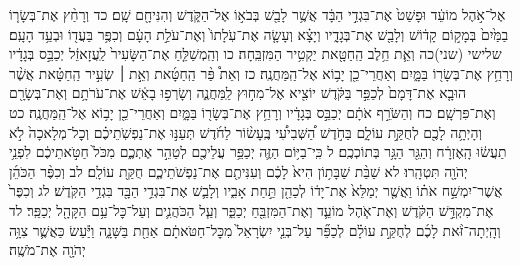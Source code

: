 \documentclass[twoside, openany, parskip=half, 11pt]{book}
\begin{document}
אֶל־אֹ֣הֶל מוֹעֵ֔ד וּפָשַׁט֙ אֶת־בִּגְדֵ֣י הַבָּ֔ד אֲשֶׁ֥ר לָבַ֖שׁ בְּבֹא֣וֹ אֶל־הַקֹּ֑דֶשׁ וְהִנִּיחָ֖ם שָֽׁם׃ כד וְרָחַ֨ץ אֶת־בְּשָׂר֤וֹ בַמַּ֙יִם֙ בְּמָק֣וֹם קָד֔וֹשׁ וְלָבַ֖שׁ אֶת־בְּגָדָ֑יו וְיָצָ֗א וְעָשָׂ֤ה אֶת־עֹֽלָתוֹ֙ וְאֶת־עֹלַ֣ת הָעָ֔ם וְכִפֶּ֥ר בַּעֲד֖וֹ וּבְעַ֥ד הָעָֽם׃ שלישי (שני)כה וְאֵ֛ת חֵ֥לֶב הַֽחַטָּ֖את יַקְטִ֥יר הַמִּזְבֵּֽחָה׃ כו וְהַֽמְשַׁלֵּ֤חַ אֶת־הַשָּׂעִיר֙ לַֽעֲזָאזֵ֔ל יְכַבֵּ֣ס בְּגָדָ֔יו וְרָחַ֥ץ אֶת־בְּשָׂר֖וֹ בַּמָּ֑יִם וְאַחֲרֵי־כֵ֖ן יָב֥וֹא אֶל־הַֽמַּחֲנֶֽה׃ כז וְאֵת֩ פַּ֨ר הַֽחַטָּ֜את וְאֵ֣ת ׀ שְׂעִ֣יר הַֽחַטָּ֗את אֲשֶׁ֨ר הוּבָ֤א אֶת־דָּמָם֙ לְכַפֵּ֣ר בַּקֹּ֔דֶשׁ יוֹצִ֖יא אֶל־מִח֣וּץ לַֽמַּחֲנֶ֑ה וְשָׂרְפ֣וּ בָאֵ֔שׁ אֶת־עֹרֹתָ֥ם וְאֶת־בְּשָׂרָ֖ם וְאֶת־פִּרְשָֽׁם׃ כח וְהַשֹּׂרֵ֣ף אֹתָ֔ם יְכַבֵּ֣ס בְּגָדָ֔יו וְרָחַ֥ץ אֶת־בְּשָׂר֖וֹ בַּמָּ֑יִם וְאַחֲרֵי־כֵ֖ן יָב֥וֹא אֶל־הַֽמַּחֲנֶֽה׃ כט וְהָיְתָ֥ה לָכֶ֖ם לְחֻקַּ֣ת עוֹלָ֑ם בַּחֹ֣דֶשׁ הַ֠שְּׁבִיעִ֠י בֶּֽעָשׂ֨וֹר לַחֹ֜דֶשׁ תְּעַנּ֣וּ אֶת־נַפְשֹֽׁתֵיכֶ֗ם וְכׇל־מְלָאכָה֙ לֹ֣א תַעֲשׂ֔וּ הָֽאֶזְרָ֔ח וְהַגֵּ֖ר הַגָּ֥ר בְּתוֹכְכֶֽם׃ ל כִּֽי־בַיּ֥וֹם הַזֶּ֛ה יְכַפֵּ֥ר עֲלֵיכֶ֖ם לְטַהֵ֣ר אֶתְכֶ֑ם מִכֹּל֙ חַטֹּ֣אתֵיכֶ֔ם לִפְנֵ֥י יְהֹוָ֖ה תִּטְהָֽרוּ׃ לא שַׁבַּ֨ת שַׁבָּת֥וֹן הִיא֙ לָכֶ֔ם וְעִנִּיתֶ֖ם אֶת־נַפְשֹׁתֵיכֶ֑ם חֻקַּ֖ת עוֹלָֽם׃ לב וְכִפֶּ֨ר הַכֹּהֵ֜ן אֲשֶׁר־יִמְשַׁ֣ח אֹת֗וֹ וַאֲשֶׁ֤ר יְמַלֵּא֙ אֶת־יָד֔וֹ לְכַהֵ֖ן תַּ֣חַת אָבִ֑יו וְלָבַ֛שׁ אֶת־בִּגְדֵ֥י הַבָּ֖ד בִּגְדֵ֥י הַקֹּֽדֶשׁ׃ לג וְכִפֶּר֙ אֶת־מִקְדַּ֣שׁ הַקֹּ֔דֶשׁ וְאֶת־אֹ֧הֶל מוֹעֵ֛ד וְאֶת־הַמִּזְבֵּ֖חַ יְכַפֵּ֑ר וְעַ֧ל הַכֹּהֲנִ֛ים וְעַל־כׇּל־עַ֥ם הַקָּהָ֖ל יְכַפֵּֽר׃ לד וְהָֽיְתָה־זֹּ֨את לָכֶ֜ם לְחֻקַּ֣ת עוֹלָ֗ם לְכַפֵּ֞ר עַל־בְּנֵ֤י יִשְׂרָאֵל֙ מִכׇּל־חַטֹּאתָ֔ם אַחַ֖ת בַּשָּׁנָ֑ה וַיַּ֕עַשׂ כַּאֲשֶׁ֛ר צִוָּ֥ה יְהֹוָ֖ה אֶת־מֹשֶֽׁה׃
\end{document}
